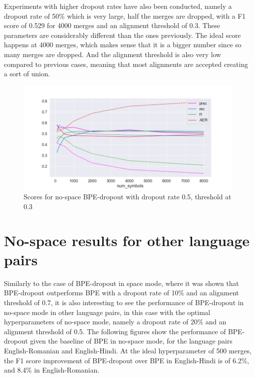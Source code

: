 Experiments with higher dropout rates have also been conducted, namely a dropout rate of 50\% which is very large, half the merges are dropped, with a F1 score of 0.529 for 4000 merges and an alignment threshold of 0.3. These parameters are considerably different than the ones previously. The ideal score happens at 4000 merges, which makes sense that it is a bigger number since so many merges are dropped. And the alignment threshold is also very low compared to previous cases, meaning that most alignments are accepted creating a sort of union.

\begin{figure}[!ht]
    \centering
    \includegraphics[width=13cm]{../reports/scores_dropout_bpe/no space/0.5/scores_ns_0.3_thres.png}
    \caption{Scores for no-space BPE-dropout with dropout rate 0.5, threshold at 0.3}
\end{figure}

\section{No-space results for other language pairs}

Similarly to the case of BPE-dropout in space mode, where it was shown that BPE-dropout outperforms BPE with a dropout rate of 10\% and an alignment threshold of 0.7, it is also interesting to see the performance of BPE-dropout in no-space mode in other language pairs, in this case with the optimal hyperparameters of no-space mode, namely a dropout rate of 20\% and an alignment threshold of 0.5. The following figures show the performance of BPE-dropout given the baseline of BPE in no-space mode, for the language pairs English-Romanian and English-Hindi. At the ideal hyperparameter of 500 merges, the F1 score improvement of BPE-dropout over BPE in English-Hindi is of 6.2\%, and 8.4\% in English-Romanian.

